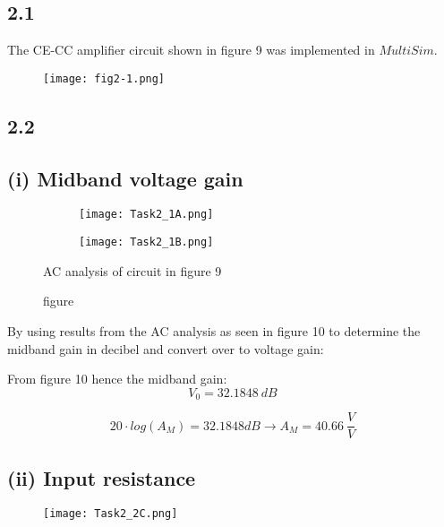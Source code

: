 \subsection*{2.1}
  The CE-CC amplifier circuit shown in figure 9 was implemented in $MultiSim$.
    \begin{figure}[h!]
        \centering
        \texttt{[image: fig2-1.png]}
    \end{figure}    


\subsection*{2.2}
  \subsection*{(i) Midband voltage gain}

	\begin{figure}[h]
        \centering
        \begin{subfigure}[h]{0.7\textwidth}
                \texttt{[image: Task2\_1A.png]}
                \label{fig:HJÖRLEIFUR}
        \end{subfigure}
        \begin{subfigure}[h]{0.25\textwidth}
                \texttt{[image: Task2\_1B.png]}
                \label{fig:LÁRUS}
        \end{subfigure}
        \caption{figure}{AC analysis of circuit in figure 9}
	\end{figure}

    By using results from the AC analysis as seen in figure 10 to determine the midband gain in decibel and convert over to voltage gain:

   	From figure 10 hence the midband gain:
   	$$ V_{0} = 32.1848 \ dB $$ 

   	$$ 20 \cdot log(A_{M}) = 32.1848 dB \rightarrow A_{M} = 40.66\  \frac{V}{V} $$



	\subsection*{(ii) Input resistance}
    \begin{figure}[h!]
        \centering
        \texttt{[image: Task2\_2C.png]}
    \end{figure}  

